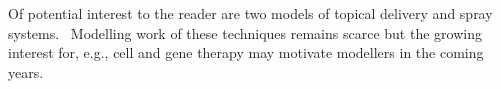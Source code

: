 \documentclass[12pt,a4paper]{journal}
\begin{document}
Of potential interest to the reader are two models of topical delivery and spray systems.~\cite{Mori_2017,Nweze_2020}
Modelling work of these techniques remains scarce but the growing interest for, e.g., cell and gene therapy may motivate modellers in the coming years.

% 
% 
\end{document}
